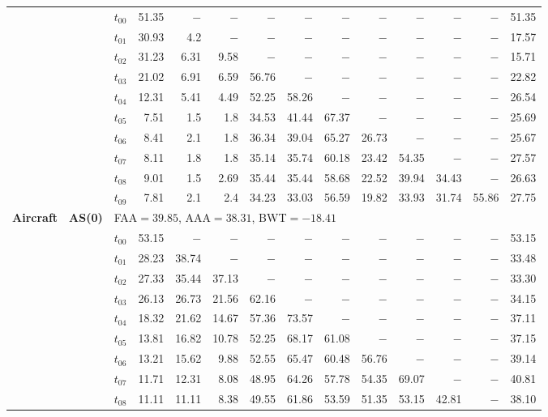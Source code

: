 \begin{table}[ht]
\begin{tabular}{@{}l l l *{11}{r}@{}}
 & & $t_{00}$ & 51.35 & $-$ & $-$ & $-$ & $-$ & $-$ & $-$ & $-$ & $-$ & $-$ & 51.35 \\
 & & $t_{01}$ & 30.93 & 4.2 & $-$ & $-$ & $-$ & $-$ & $-$ & $-$ & $-$ & $-$ & 17.57 \\
 & & $t_{02}$ & 31.23 & 6.31 & 9.58 & $-$ & $-$ & $-$ & $-$ & $-$ & $-$ & $-$ & 15.71 \\
 & & $t_{03}$ & 21.02 & 6.91 & 6.59 & 56.76 & $-$ & $-$ & $-$ & $-$ & $-$ & $-$ & 22.82 \\
 & & $t_{04}$ & 12.31 & 5.41 & 4.49 & 52.25 & 58.26 & $-$ & $-$ & $-$ & $-$ & $-$ & 26.54 \\
 & & $t_{05}$ & 7.51 & 1.5 & 1.8 & 34.53 & 41.44 & 67.37 & $-$ & $-$ & $-$ & $-$ & 25.69 \\
 & & $t_{06}$ & 8.41 & 2.1 & 1.8 & 36.34 & 39.04 & 65.27 & 26.73 & $-$ & $-$ & $-$ & 25.67 \\
 & & $t_{07}$ & 8.11 & 1.8 & 1.8 & 35.14 & 35.74 & 60.18 & 23.42 & 54.35 & $-$ & $-$ & 27.57 \\
 & & $t_{08}$ & 9.01 & 1.5 & 2.69 & 35.44 & 35.44 & 58.68 & 22.52 & 39.94 & 34.43 & $-$ & 26.63 \\
 & & $t_{09}$ & 7.81 & 2.1 & 2.4 & 34.23 & 33.03 & 56.59 & 19.82 & 33.93 & 31.74 & 55.86 & 27.75 \\
\midrule
\multirow{11}{*}{\textbf{Aircraft}} & \multirow{11}{*}{\textbf{AS(0)}} & \multicolumn{12}{l}{\quad\small FAA$=39.85$,\; AAA$=38.31$,\; BWT$=-18.41$} \\
 & & $t_{00}$ & 53.15 & $-$ & $-$ & $-$ & $-$ & $-$ & $-$ & $-$ & $-$ & $-$ & 53.15 \\
 & & $t_{01}$ & 28.23 & 38.74 & $-$ & $-$ & $-$ & $-$ & $-$ & $-$ & $-$ & $-$ & 33.48 \\
 & & $t_{02}$ & 27.33 & 35.44 & 37.13 & $-$ & $-$ & $-$ & $-$ & $-$ & $-$ & $-$ & 33.30 \\
 & & $t_{03}$ & 26.13 & 26.73 & 21.56 & 62.16 & $-$ & $-$ & $-$ & $-$ & $-$ & $-$ & 34.15 \\
 & & $t_{04}$ & 18.32 & 21.62 & 14.67 & 57.36 & 73.57 & $-$ & $-$ & $-$ & $-$ & $-$ & 37.11 \\
 & & $t_{05}$ & 13.81 & 16.82 & 10.78 & 52.25 & 68.17 & 61.08 & $-$ & $-$ & $-$ & $-$ & 37.15 \\
 & & $t_{06}$ & 13.21 & 15.62 & 9.88 & 52.55 & 65.47 & 60.48 & 56.76 & $-$ & $-$ & $-$ & 39.14 \\
 & & $t_{07}$ & 11.71 & 12.31 & 8.08 & 48.95 & 64.26 & 57.78 & 54.35 & 69.07 & $-$ & $-$ & 40.81 \\
 & & $t_{08}$ & 11.11 & 11.11 & 8.38 & 49.55 & 61.86 & 53.59 & 51.35 & 53.15 & 42.81 & $-$ & 38.10 \\

\end{tabular}
\end{table}
